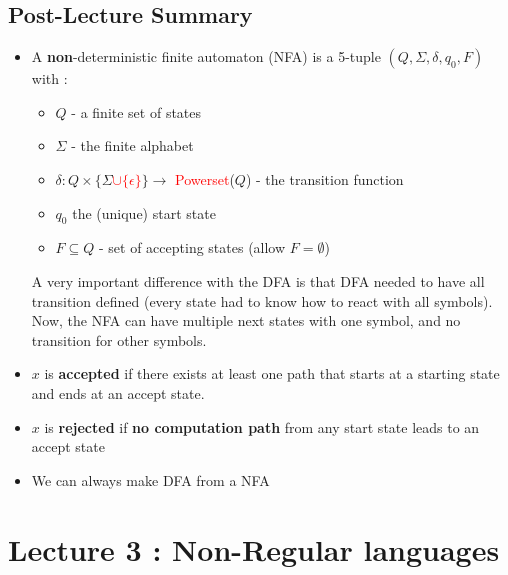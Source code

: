 \documentclass[12pt,a4paper]{article}
\newcommand{\<}{\langle}
\renewcommand{\>}{\rangle}
\begin{document}
\subsection{Post-Lecture Summary}
\begin{itemize}
    \item     A \textbf{non}-deterministic finite automaton (NFA) is a 5-tuple $(Q, \Sigma, \delta, q_0, F)$ with :        \begin{itemize}
                  \item $Q$ - a finite set of states
                  \item $\Sigma$ - the finite alphabet
                  \item $\delta: Q \times \{\Sigma$\textcolor{red}{$\cup \{\epsilon\}$}$\} \to$ \textcolor{red}{Powerset}($Q$) - the transition function
                  \item $q_0$ the (unique) start state
                  \item $F \subseteq Q$ - set of accepting states (allow $F = \emptyset$)
              \end{itemize}
              A very important difference with the DFA is that DFA needed to have all transition defined (every state had to know how to react with all symbols). Now, the NFA can have multiple next states with one symbol, and no transition for other symbols.
    \item     $x$ is \textbf{accepted} if there exists at least one path that starts at a starting state and ends at an accept state.
    \item     $x$ is \textbf{rejected} if \textbf{no computation path} from any start state leads to an accept state
    \item     We can always make  DFA from a NFA
\end{itemize}
\section{Lecture 3 : Non-Regular languages}
\end{document}
